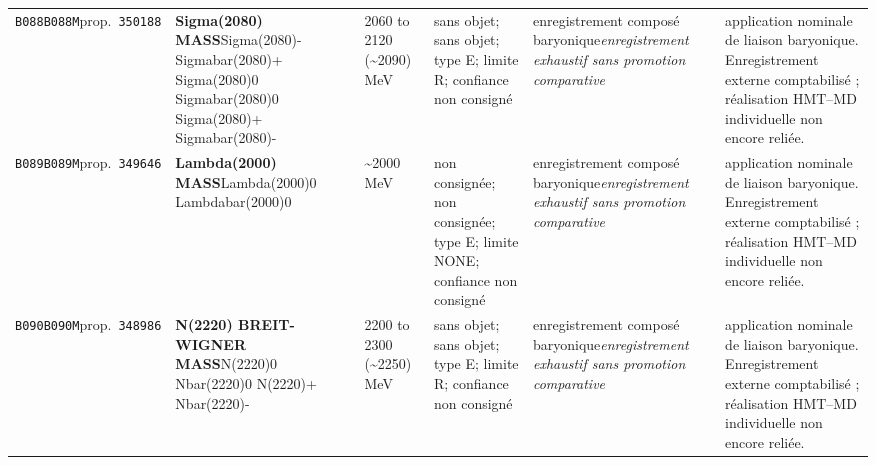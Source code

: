 \begin{landscape}
\begin{longtable}{L{1.85cm}L{4.45cm}L{2.35cm}L{4.05cm}L{3.35cm}L{7.15cm}}
\texttt{B088}\newline \texttt{B088M}\newline prop.\ \texttt{350188} & \textbf{Sigma(2080) MASS}\newline Sigma(2080)- \textbar{}\allowbreak{} Sigmabar(2080)+ \textbar{}\allowbreak{} Sigma(2080)0 \textbar{}\allowbreak{} Sigmabar(2080)0 \textbar{}\allowbreak{} Sigma(2080)+ \textbar{}\allowbreak{} Sigmabar(2080)- & 2060 to 2120 (\textasciitilde{}2090)\,MeV & sans objet; sans objet; type E; limite R; confiance non consigné & enregistrement composé baryonique\newline \emph{enregistrement exhaustif sans promotion comparative} & application nominale de liaison baryonique. Enregistrement externe comptabilisé ; réalisation HMT--MD individuelle non encore reliée. \\
\texttt{B089}\newline \texttt{B089M}\newline prop.\ \texttt{349646} & \textbf{Lambda(2000) MASS}\newline Lambda(2000)0 \textbar{}\allowbreak{} Lambdabar(2000)0 & \textasciitilde{}2000\,MeV & non consignée; non consignée; type E; limite NONE; confiance non consigné & enregistrement composé baryonique\newline \emph{enregistrement exhaustif sans promotion comparative} & application nominale de liaison baryonique. Enregistrement externe comptabilisé ; réalisation HMT--MD individuelle non encore reliée. \\
\texttt{B090}\newline \texttt{B090M}\newline prop.\ \texttt{348986} & \textbf{N(2220) BREIT-WIGNER MASS}\newline N(2220)0 \textbar{}\allowbreak{} Nbar(2220)0 \textbar{}\allowbreak{} N(2220)+ \textbar{}\allowbreak{} Nbar(2220)- & 2200 to 2300 (\textasciitilde{}2250)\,MeV & sans objet; sans objet; type E; limite R; confiance non consigné & enregistrement composé baryonique\newline \emph{enregistrement exhaustif sans promotion comparative} & application nominale de liaison baryonique. Enregistrement externe comptabilisé ; réalisation HMT--MD individuelle non encore reliée. \\

\end{longtable}
\end{landscape}
